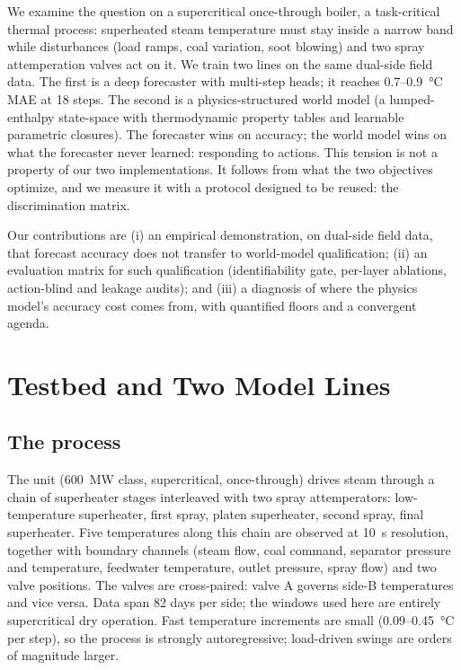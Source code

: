 \documentclass{article}
\begin{document}
We examine the question on a supercritical once-through boiler, a task-critical thermal
process: superheated steam temperature must stay inside a narrow band while disturbances
(load ramps, coal variation, soot blowing) and two spray attemperation valves act on
it. We train two lines on the same dual-side field data. The first is a deep forecaster
with multi-step heads; it reaches 0.7--0.9~\si{\degreeCelsius} MAE at 18 steps. The
second is a physics-structured world model (a lumped-enthalpy state-space with
thermodynamic property tables and learnable parametric closures). The forecaster wins on
accuracy; the world model wins on what the forecaster never learned: responding to
actions. This tension is not a property of our two implementations. It follows from what
the two objectives optimize, and we measure it with a protocol designed to be reused:
the discrimination matrix.

Our contributions are (i) an empirical demonstration, on dual-side field data, that
forecast accuracy does not transfer to world-model qualification; (ii) an evaluation
matrix for such qualification (identifiability gate, per-layer ablations, action-blind
and leakage audits); and (iii) a diagnosis of where the physics model's accuracy cost
comes from, with quantified floors and a convergent agenda.

\section{Testbed and Two Model Lines}

\subsection{The process}

The unit (600~MW class, supercritical, once-through) drives steam through a chain of
superheater stages interleaved with two spray attemperators: low-temperature
superheater, first spray, platen superheater, second spray, final superheater. Five
temperatures along this chain are observed at 10~s resolution, together with boundary
channels (steam flow, coal command, separator pressure and temperature, feedwater
temperature, outlet pressure, spray flow) and two valve positions. The valves are
cross-paired: valve A governs side-B temperatures and vice versa. Data span 82 days per
side; the windows used here are entirely supercritical dry operation. Fast temperature
increments are small (0.09--0.45~\si{\degreeCelsius} per step), so the process is
strongly autoregressive; load-driven swings are orders of magnitude larger.
\end{document}
